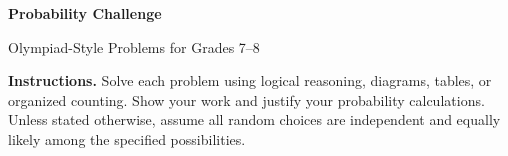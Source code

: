 \makeatletter
{}
\makeatother
{}


\pagestyle{empty}
\linespread{1}
\setlength{\parskip}{0pt}
\makeatletter
\renewcommand\section{\@startsection{section}{1}{0pt}{6pt}{2pt}{\normalfont\normalsize\bfseries}}
\makeatother
\newcommand{\challenge}[1]{\par\textit{Challenge: #1}}


\small
\begingroup
\centering
{\large\bfseries Probability Challenge\par}
{\small Olympiad-Style Problems for Grades 7--8\par}
\endgroup
\vspace{4pt}

\textbf{Instructions.} Solve each problem using logical reasoning, diagrams, tables, or organized counting. Show your work and justify your probability calculations. Unless stated otherwise, assume all random choices are independent and equally likely among the specified possibilities.

